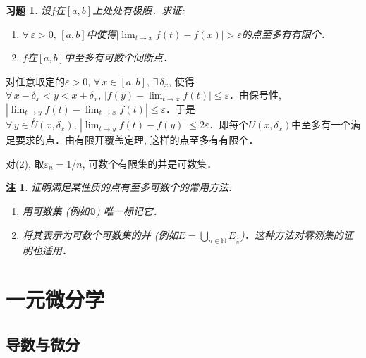 \documentclass[11pt,a4paper]{ctexart}
\makeatletter
\theoremstyle{thmseries} %
\newtheorem{thm}{定理}[section]
\theoremstyle{exerseries}
\newtheorem{exer}{习题}[section]
\newtheorem*{rem}{注}
\renewenvironment{proof}[1][\proofname]{\par
  \pushQED{\qed}%
  \normalfont \topsep6\p@\@plus6\p@\relax
  \trivlist
  \item[\hskip\labelsep
        \itshape
    #1\@addpunct{}]\ignorespaces
}{%
  \popQED\endtrivlist\@endpefalse
}
\newenvironment{pf}{\begin{proof}[\bfseries\upshape 证\quad]}{\end{proof}}
\newcommand{\bra}[1]{\mathopen{}\left(#1\right)}
\renewcommand{\epsilon}{\varepsilon}
\renewcommand{\phi}{\varphi}
\newcommand{\dnei}{\overset{\circ}{U}}
\newcommand{\N}{\mathbb{N}}
\newcommand{\Q}{\mathbb{Q}}
\makeatother
\begin{document}
\begin{exer}
	设$f$在$[a,b]$上处处有极限．求证: 
	\begin{enumerate}
		\item $\forall\,\epsilon>0,\,[a,b]$中使得$|\lim_{t\to x}f(t)-f(x)|>\epsilon$的点至多有有限个．
		\item $f$在$[a,b]$中至多有可数个间断点．
	\end{enumerate}
\end{exer}
\begin{pf}
	对任意取定的$\epsilon>0$, $\forall\,x\in[a,b],\,\exists\,\delta_x$, 使得$\forall\,x-\delta_x<y<x+\delta_x,\,|f(y)-\lim_{t\to x}f(t)|\leq\epsilon$．由保号性, $|\lim_{t\to y}f(t)-\lim_{t\to x}f(t)|\leq\epsilon$．于是$\forall\,y\in\dnei(x,\delta_x),\,|\lim_{t\to y}f(t)-f(y)|\leq2\epsilon$．即每个$U(x,\delta_x)$中至多有一个满足要求的点．由有限开覆盖定理, 这样的点至多有有限个．

	对(2), 取$\epsilon_n=1/n$, 可数个有限集的并是可数集．
\end{pf}
\begin{rem}
	证明满足某性质的点有至多可数个的常用方法: 
	\begin{enumerate}
		\item 用可数集 (例如$\Q$) 唯一标记它．
		\item 将其表示为可数个可数集的并 (例如$E=\bigcup_{n\in \N}E_{\frac{1}{n}}$)．这种方法对零测集的证明也适用．
	\end{enumerate}
\end{rem}


\section{一元微分学}
\subsection{导数与微分}

\end{document}
